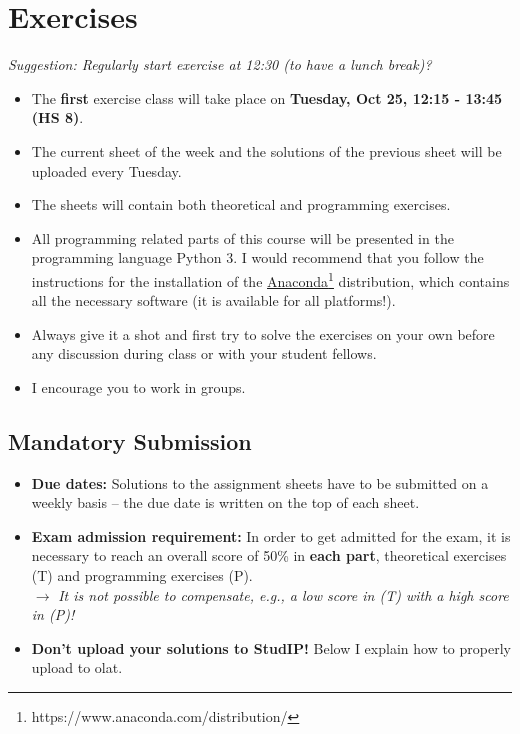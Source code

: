 \documentclass{article}
\def\firstexercise{{\color{black} \bfseries Tuesday, Oct 25, 12:15 - 13:45 (HS 8)}}
\def\exercisedatesUploadday{Tuesday}
\begin{document}
\section{Exercises} \label{sec:exercise}
\textit{Suggestion: Regularly start exercise at 12:30 (to have a lunch break)?}
\begin{itemize}
	\item The \textbf{first} exercise class will take place on {\firstexercise}.
	\item The current sheet of the week and the solutions of the previous sheet will be uploaded every \exercisedatesUploadday.
	\item The sheets will contain both theoretical and programming exercises.
	\item  All programming related parts of this course will be presented in the programming language Python 3. I would recommend that you follow the instructions for the installation of the \hyperref{https://www.anaconda.com/distribution/}{}{}{Anaconda}\footnote{https://www.anaconda.com/distribution/} distribution, which contains all the necessary software (it is available for all platforms!).
	\item Always give it a shot and first try to solve the exercises on your own before any discussion during class or with your student fellows. 
	\item I encourage you to work in groups.
\end{itemize}
\subsection{Mandatory Submission}
\begin{itemize}
	\item \textbf{Due dates:} Solutions to the assignment sheets have to be submitted on a weekly basis – the due date is written on the top of each
sheet. %
\item \textbf{Exam admission requirement:} In order to get admitted for the exam, it is necessary to reach an overall score of 50\% in \textbf{each part}, theoretical exercises (T) and programming exercises (P).\\
$\rightarrow$ \textit{It is not possible to compensate, e.g., a low score in (T) with a high score in (P)!}
\item \textbf{Don't upload your solutions to StudIP!} Below I explain how to properly upload to olat.
\end{itemize}
\end{document}
